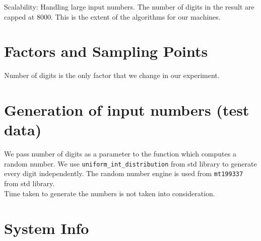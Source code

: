 \documentclass{DIKU-report}
\begin{document}
Scalability: Handling large input numbers. The number of digits in the result are capped at 8000. This is the extent of the algorithms for our machines.

\section{Factors and Sampling Points}
Number of digits is the only factor that we change in our experiment.

\section{Generation of input numbers (test data)}
We pass number of digits as a parameter to the function which computes a random number. We use \texttt{uniform\_int\_distribution} from std library to generate every digit independently. The random number engine is used from \texttt{mt199337} from std library.
\\Time taken to generate the numbers is not taken into consideration.
\section{System Info}

\vspace*{\fill}
\newpage
\end{document}
